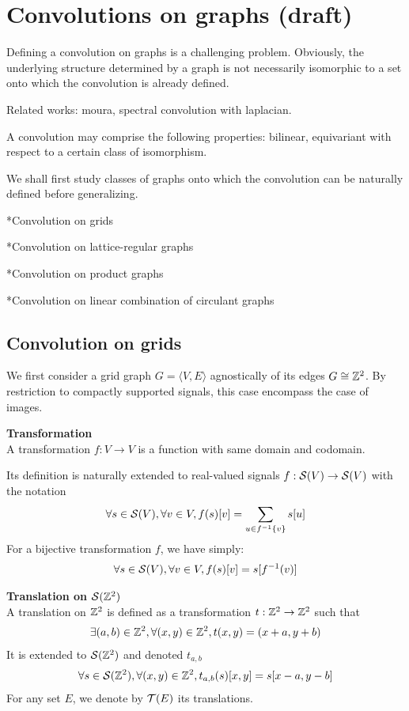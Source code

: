 \section{Convolutions on graphs (draft)}

Defining a convolution on graphs is a challenging problem. Obviously, the underlying structure determined by a graph is not necessarily isomorphic to a set onto which the convolution is already defined. 

Related works: moura, spectral convolution with laplacian.

A convolution may comprise the following properties: bilinear, equivariant with respect to a certain class of isomorphism.

We shall first study classes of graphs onto which the convolution can be naturally defined before generalizing.

*Convolution on grids

*Convolution on lattice-regular graphs

*Convolution on product graphs

*Convolution on linear combination of circulant graphs

\subsection{Convolution on grids}

We first consider a grid graph $G = \langle V,E \rangle$ agnostically of its edges \ie $G \cong \mathbb{Z}^2$. By restriction to compactly supported signals, this case encompass the case of images.

\begin{definition}\textbf{Transformation}\\
A transformation $f: V \rightarrow V$ is a function with same domain and codomain.

Its definition is naturally extended to real-valued signals $f: \mathcal{S}(V) \rightarrow \mathcal{S}(V)$ with the notation
\begin{gather*}
\forall s \in \mathcal{S}(V), \forall v \in V, f(s)[v] = \sum_{u \in f^{-1}\{v\}}{s[u]}
\end{gather*}
For a bijective transformation $f$, we have simply:
\begin{gather*}
\forall s \in \mathcal{S}(V), \forall v \in V, f(s)[v] = s[f^{-1}(v)]
\end{gather*}
\end{definition}

\begin{definition}\textbf{Translation on $\mathcal{S}(\mathbb{Z}^2)$}\\
A translation on $\mathbb{Z}^2$ is defined as a transformation $t: \mathbb{Z}^2 \rightarrow \mathbb{Z}^2$ such that
\begin{gather*}
\exists (a,b) \in \mathbb{Z}^2, \forall (x,y) \in \mathbb{Z}^2, t(x,y) = (x+a,y+b)
\end{gather*}
It is extended to $\mathcal{S}(\mathbb{Z}^2)$ and denoted $t_{a,b}$ \ie
\begin{gather*}
\forall s \in \mathcal{S}(\mathbb{Z}^2), \forall (x,y) \in \mathbb{Z}^2, t_{a,b}(s)[x,y] = s[x-a, y-b]
\end{gather*}
For any set $E$, we denote by $\mathcal{T}(E)$ its translations.
\end{definition}

